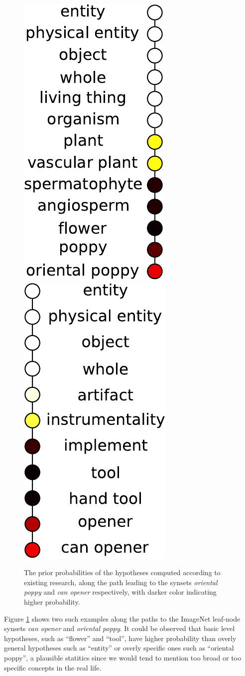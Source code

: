 \begin{figure}
    \centering
    \includegraphics[height=0.4\textwidth]{figs/taskadaptation/prior_path_poppy.pdf} \hspace{0.1in}%
    \includegraphics[height=0.4\textwidth]{figs/taskadaptation/prior_path_canopener.pdf}
    \caption{The prior probabilities of the hypotheses computed according to existing research, along the path leading to the synsets \emph{oriental poppy} and \emph{can opener} respectively, with darker color indicating higher probability.}\label{fig:conceptprior}
\end{figure}

Figure \ref{fig:conceptprior} shows two such examples along the paths to the ImageNet leaf-node synsets \emph{can opener} and \emph{oriental poppy}.  It could be observed that basic level hypotheses, such as ``flower'' and ``tool'', have higher probability than overly general hypotheses such as ``entity'' or overly specific ones such as ``oriental poppy'', a plausible statitics since we would tend to mention too broad or too specific concepts in the real life.

